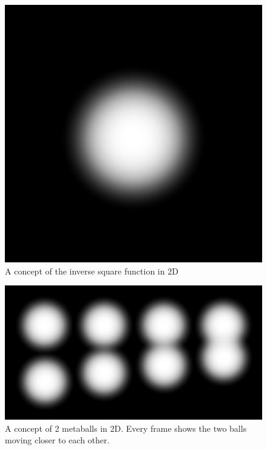 \documentclass{article}
\begin{document}
\begin{multicols}{2}
            \begin{figure}[H]
            	\centering
            	\begin{minipage}[b]{0.2\textwidth}
            		\centering
            		\includegraphics[width=\textwidth]{img/2d-potential.png}
            		\caption{A concept of the inverse square function in 2D}
		            \label{fig:2d-potential}
            	\end{minipage}
            \end{figure}
        
        	\begin{figure}[H]
        		\centering
            	\begin{minipage}[b]{0.4\textwidth}
            		\includegraphics[width=\textwidth]{img/2d-potential-multi.png}
            		\caption{A concept of 2 metaballs in 2D. Every frame shows the two balls moving closer to each other.}
            		\label{fig:2d-potential-multi}
            	\end{minipage}
            \end{figure}


\end{multicols}
\end{document}
